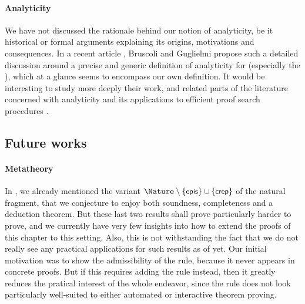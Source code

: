 \paragraph{Analyticity}

We have not discussed the rationale behind our notion of analyticity, be it
historical or formal arguments explaining its origins, motivations and
consequences. In a recent article , Bruscoli
and Guglielmi propose such a detailed discussion around a precise and generic
definition of analyticity for   (especially the
), which at a glance seems to encompass our own
definition. It would be interesting to study more deeply their work, and related
parts of the  literature concerned with analyticity and its
applications to efficient proof search procedures
.

\subsection{Future works}

\paragraph{Metatheory}

In , we already mentioned the variant $\Nature \setminus
\{\rsf{epis}\} \cup \{\rsf{crep}\}$ of the natural fragment, that we conjecture
to enjoy both soundness, completeness and a deduction theorem. But these last
two results shall prove particularly harder to prove, and we currently have very
few insights into how to extend the proofs of this chapter to this setting.
Also, this is not withstanding the fact that we do not really see any practical
applications for such results as of yet. Our initial motivation was to show the
admissibility of the  rule, because it never appears in concrete
proofs. But if this requires adding the  rule instead, then it greatly
reduces the pratical interest of the whole endeavor, since the  rule
does not look particularly well-suited to either automated or interactive
theorem proving.

